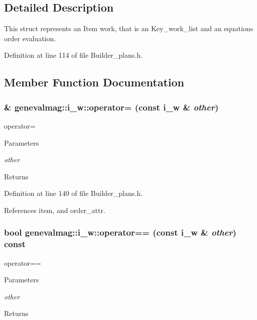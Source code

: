 \subsection{Detailed Description}
This struct represents an Item work, that is an Key\_\-work\_\-list and an equations order evaluation. 

Definition at line 114 of file Builder\_\-plans.h.



\subsection{Member Function Documentation}
\hypertarget{structgenevalmag_1_1i__w_ab769b7c451b0e1c4d2cb36eba15f99ab}{
\subsubsection[{operator=}]{\& genevalmag::i\_\-w::operator= (const {\bf i\_\-w} \& {\em other})}}
\label{structgenevalmag_1_1i__w_ab769b7c451b0e1c4d2cb36eba15f99ab}
operator= 
\begin{DoxyParams}{Parameters}
\item[{\em other}]\end{DoxyParams}
\begin{DoxyReturn}{Returns}

\end{DoxyReturn}


Definition at line 140 of file Builder\_\-plans.h.



References item, and order\_\-attr.

\hypertarget{structgenevalmag_1_1i__w_ac382c0ff3ab5b4ae50512a64ec16ae5d}{
\subsubsection[{operator==}]{\setlength{\rightskip}{0pt plus 5cm}bool genevalmag::i\_\-w::operator== (const {\bf i\_\-w} \& {\em other}) const}}
\label{structgenevalmag_1_1i__w_ac382c0ff3ab5b4ae50512a64ec16ae5d}
operator== 
\begin{DoxyParams}{Parameters}
\item[{\em other}]\end{DoxyParams}
\begin{DoxyReturn}{Returns}

\end{DoxyReturn}


